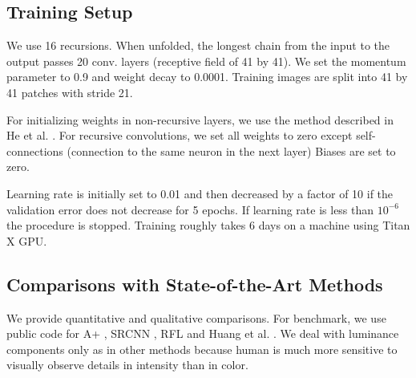 \documentclass[10pt,twocolumn,letterpaper]{article}
\begin{document}
\subsection{Training Setup}
%
%
%
%
%
%

We use 16 recursions. When unfolded, the longest chain from the input to the output passes 20 conv. layers (receptive field of 41 by 41). We set the momentum parameter to 0.9 and weight decay to 0.0001. Training images are split into 41 by 41 patches with stride 21. 

For initializing weights in non-recursive layers, we use the method described in He et al. \cite{he2015delving}. For recursive convolutions, we set all weights to zero except self-connections (connection to the same neuron in the next layer) \cite{socher2012semantic, le2015simple}  Biases are set to zero.

Learning rate is initially set to 0.01 and then decreased by a factor of 10 if the validation error does not decrease for 5 epochs. If learning rate is less than $10^{-6}$ the procedure is stopped. Training roughly takes 6 days on a machine using Titan X GPU. 


\subsection{Comparisons with State-of-the-Art Methods}
We provide quantitative and qualitative comparisons. For benchmark, we use public code for A+ \cite{Timofte}, SRCNN \cite{dong2014image}, RFL \cite{schulter2015fast} and  Huang et al. \cite{Huang-CVPR-2015}. We deal with luminance components only as in other methods because human is much more sensitive to visually observe details in intensity than in color. 
\end{document}
